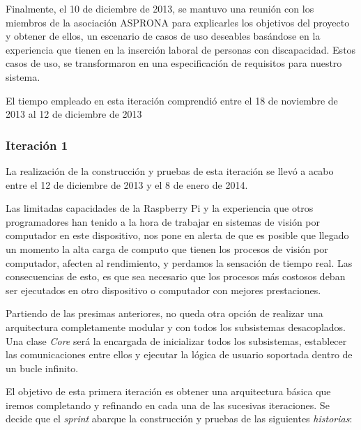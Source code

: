 Finalmente, el 10 de diciembre de 2013, se mantuvo una reunión con los miembros de la asociación ASPRONA para explicarles los objetivos del proyecto y obtener de ellos, un escenario de casos de uso deseables basándose en la experiencia que tienen en la inserción laboral de personas con discapacidad. Estos casos de uso, se transformaron en una especificación de requisitos para nuestro sistema.

El tiempo empleado en esta iteración comprendió entre el 18 de noviembre de 2013 al 12 de diciembre de 2013

\subsubsection{Iteración 1}
La realización de la construcción y pruebas de esta iteración se llevó a acabo entre el 12 de diciembre de 2013 y el 8 de enero de 2014.


Las limitadas capacidades de la Raspberry Pi y la experiencia que otros programadores han tenido a la hora de trabajar en sistemas de visión por computador en este dispositivo, nos pone en alerta de que es posible que llegado un momento la alta carga de computo que tienen los procesos de visión por computador, afecten al rendimiento, y perdamos la sensación de tiempo real. Las consecuencias de esto, es que sea necesario que los procesos más costosos deban ser ejecutados en otro dispositivo o computador con mejores prestaciones.  

Partiendo de las presimas anteriores, no queda otra opción de realizar una arquitectura completamente modular y con todos los subsistemas desacoplados. Una clase \emph{Core} será la encargada de inicializar todos los subsistemas, establecer las comunicaciones entre ellos y ejecutar la lógica de usuario soportada dentro de un bucle infinito.


El objetivo de esta primera iteración es obtener una arquitectura básica que iremos completando y refinando en cada una de las sucesivas iteraciones. Se decide que el \textit{sprint} abarque la construcción y pruebas de las siguientes \textit{historias}:

